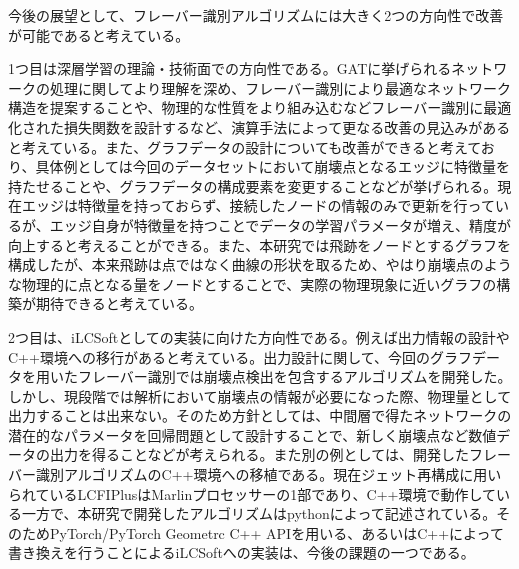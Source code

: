 今後の展望として、フレーバー識別アルゴリズムには大きく2つの方向性で改善が可能であると考えている。

1つ目は深層学習の理論・技術面での方向性である。GATに挙げられるネットワークの処理に関してより理解を深め、フレーバー識別により最適なネットワーク構造を提案することや、物理的な性質をより組み込むなどフレーバー識別に最適化された損失関数を設計するなど、演算手法によって更なる改善の見込みがあると考えている。また、グラフデータの設計についても改善ができると考えており、具体例としては今回のデータセットにおいて崩壊点となるエッジに特徴量を持たせることや、グラフデータの構成要素を変更することなどが挙げられる。現在エッジは特徴量を持っておらず、接続したノードの情報のみで更新を行っているが、エッジ自身が特徴量を持つことでデータの学習パラメータが増え、精度が向上すると考えることができる。また、本研究では飛跡をノードとするグラフを構成したが、本来飛跡は点ではなく曲線の形状を取るため、やはり崩壊点のような物理的に点となる量をノードとすることで、実際の物理現象に近いグラフの構築が期待できると考えている。

2つ目は、iLCSoftとしての実装に向けた方向性である。例えば出力情報の設計やC++環境への移行があると考えている。出力設計に関して、今回のグラフデータを用いたフレーバー識別では崩壊点検出を包含するアルゴリズムを開発した。しかし、現段階では解析において崩壊点の情報が必要になった際、物理量として出力することは出来ない。そのため方針としては、中間層で得たネットワークの潜在的なパラメータを回帰問題として設計することで、新しく崩壊点など数値データの出力を得ることなどが考えられる。また別の例としては、開発したフレーバー識別アルゴリズムのC++環境への移植である。現在ジェット再構成に用いられているLCFIPlusはMarlinプロセッサーの1部であり、C++環境で動作している一方で、本研究で開発したアルゴリズムはpythonによって記述されている。そのためPyTorch/PyTorch Geometrc C++ APIを用いる、あるいはC++によって書き換えを行うことによるiLCSoftへの実装は、今後の課題の一つである。
